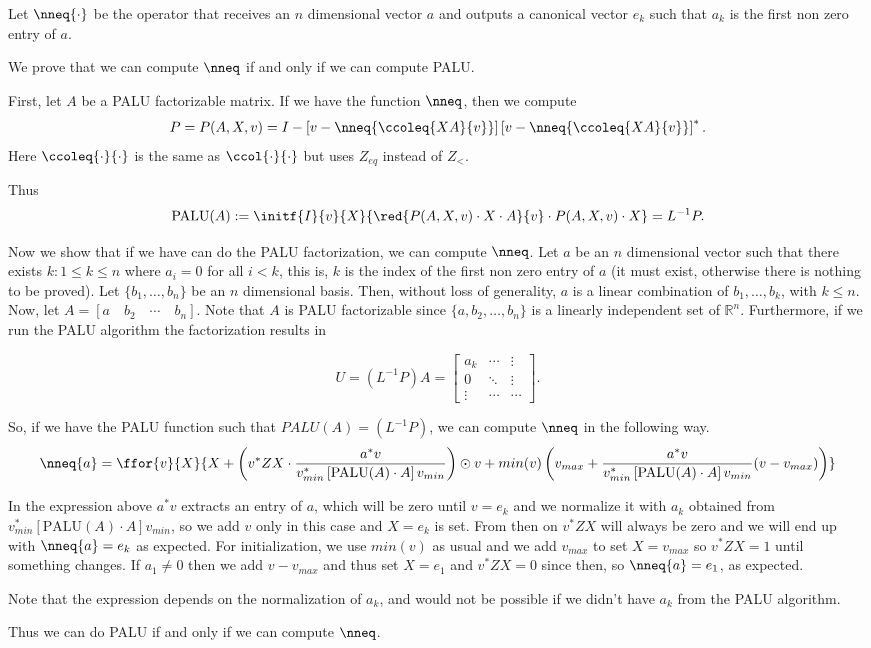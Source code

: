 Let $\nneq{\cdot}$ be the operator that receives an $n$ dimensional vector $a$ and outputs a canonical vector $e_k$ such that $a_k$ is the first non zero entry of $a$. 

We prove that we can compute $\nneq$ if and only if we can compute PALU.

First, let $A$ be a PALU factorizable matrix. If we have the function $\nneq$, then we compute $$P=P(A,X,v) = I - \left[ v - \nneq{ \ccoleq{XA}{v} } \right]\left[ v - \nneq{ \ccoleq{XA}{v} } \right]^*.$$ Here $\ccoleq{\cdot}{\cdot}$ is the same as $\ccol{\cdot}{\cdot}$ but uses $Z_{eq}$ instead of $Z_{<}$.

Thus $$\text{PALU}(A):=\initf{I}{v}{X}{\red{P(A,X,v)\cdot X\cdot A}{v}\cdot P(A,X,v)\cdot X}= L^{-1}P.$$

Now we show that if we have can do the PALU factorization, we can compute $\nneq$. Let $a$ be an $n$ dimensional vector such that there exists $k:1\leq k\leq n$ where $a_i=0$ for all $i<k$, this is, $k$ is the index of the first non zero entry of $a$ (it must exist, otherwise there is nothing to be proved). Let $\lbrace b_1, \ldots, b_n\rbrace$ be an $n$ dimensional basis. Then, without loss of generality, $a$ is a linear combination of $b_1, \ldots, b_k$, with $k \leq n$. Now, let $A = \left[ a\hspace{1em} b_2 \hspace{1em} \cdots \hspace{1em}  b_n \right].$ Note that $A$ is PALU factorizable since $\lbrace a, b_2, \ldots, b_n\rbrace$ is a linearly independent set of $\mathbb{R}^n$. Furthermore, if we run the PALU algorithm the factorization results in

\[
U=(L^{-1}P)A = \begin{bmatrix}
    a_k & \cdots &  \vdots \\
    0 & \ddots & \vdots \\
    \vdots & \cdots & \cdots 
\end{bmatrix}.
\]

So, if we have the PALU function such that $PALU(A)=(L^{-1}P)$, we can compute $\nneq$ in the following way. $$\nneq{a}=\ffor{v}{X}{X+\left( v^*ZX\cdot\dfrac{a^*v}{v_{min}^*\left[ \text{PALU}(A)\cdot A\right]v_{min}} \right)\odot v + min(v)\left( v_{max} + \dfrac{a^*v}{v_{min}^*\left[ \text{PALU}(A)\cdot A\right]v_{min}}(v-v_{max})\right)}$$

In the expression above $a^*v$ extracts an entry of $a$, which will be zero until $v=e_k$ and we normalize it with $a_k$ obtained from $v_{min}^*\left[\text{PALU}(A)\cdot A\right]v_{min}$, so we add $v$ only in this case and $X=e_k$ is set. From then on $v^*ZX$ will always be zero and we will end up with $\nneq{a}=e_k$ as expected. For initialization, we use $min(v)$ as usual and we add $v_{max}$ to set $X=v_{max}$ so $v^*ZX=1$ until something changes. If $a_1\neq 0$ then we add $v-v_{max}$ and thus set $X=e_1$ and $v^*ZX=0$ since then, so $\nneq{a}=e_1$, as expected.

Note that the expression depends on the normalization of $a_k$, and would not be possible if we didn't have $a_k$ from the PALU algorithm.

Thus we can do PALU if and only if we can compute $\nneq$.